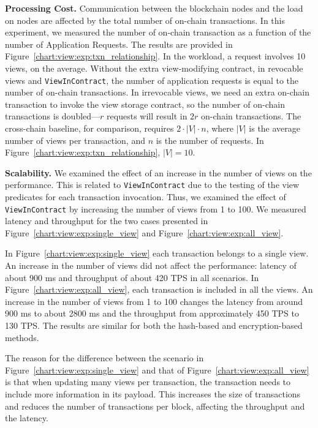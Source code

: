 \medskip
\noindent
\textbf{Processing Cost.}
Communication between the blockchain nodes and the load on nodes are affected by the total number of on-chain transactions. In this experiment, we measured the number of on-chain transaction as a function of the number of Application Requests.  
The results are provided in Figure~\ref{chart:view:exp:txn_relationship}.
In the workload, a request involves 10 views, on the average. 
Without the extra view-modifying contract, in revocable views and \texttt{ViewInContract}, the number of application requests is equal to the number of on-chain transactions. In irrevocable views, we need an extra on-chain transaction to invoke the view storage contract, so the number of on-chain transactions is doubled---$r$ requests will result in $2r$ on-chain transactions.  
The cross-chain baseline, for comparison, requires $2\cdot |V|\cdot n$, where $|V|$ is the average number of views per transaction,  and $n$ is the number of requests. In Figure~\ref{chart:view:exp:txn_relationship}, $|V|=10$. 



\medskip
\noindent
\textbf{Scalability.}
We examined the effect of an increase in the number of views on the performance. 
This is related to \texttt{ViewInContract} due to the testing of the view predicates for each transaction invocation. Thus, we examined the effect of \texttt{ViewInContract} by increasing the number of views from 1 to 100. 
We measured latency and throughput for the two cases presented in Figure~\ref{chart:view:exp:single_view} and Figure~\ref{chart:view:exp:all_view}.

In Figure~\ref{chart:view:exp:single_view} each transaction belongs to a single view. An increase in the number of views did not affect the performance: latency of about 900 ms and throughput of about 420 TPS in all scenarios. 
In Figure~\ref{chart:view:exp:all_view}, each transaction is included in all the views. An increase in the number of views from 1 to 100 changes the latency from around 900 ms to about 2800 ms and the throughput from approximately 450 TPS to 130 TPS.
The results are similar for both the hash-based and encryption-based methods.

The reason for the difference between the scenario in Figure~\ref{chart:view:exp:single_view} and that of Figure~\ref{chart:view:exp:all_view} is that when updating many views per transaction, the transaction needs to include more information in its payload. This increases the size of transactions and reduces the number of transactions per block, affecting the throughput and the latency.